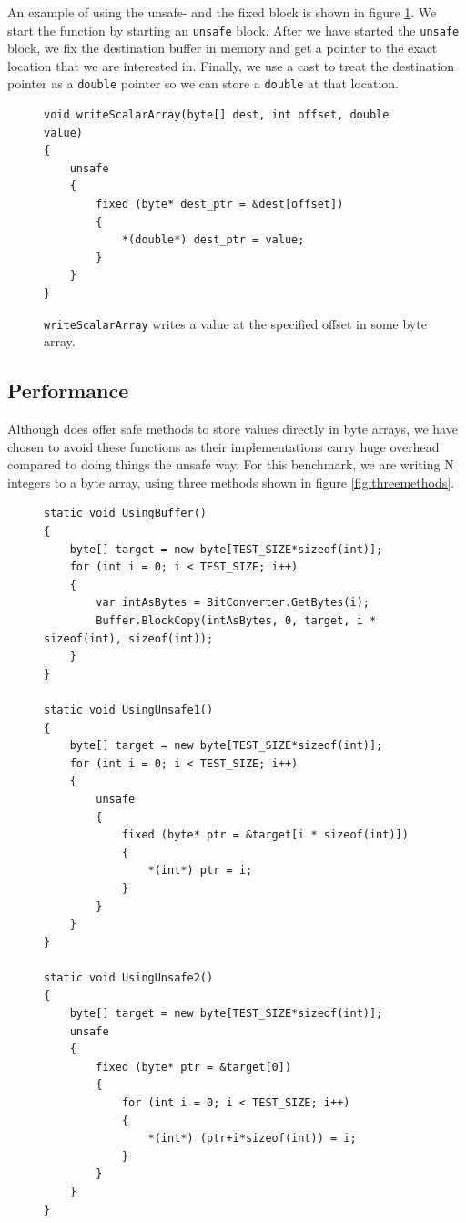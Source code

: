 \begin{description}
An example of using the unsafe- and the fixed block is shown in figure
\ref{fig:writeScalarArray'}. We start the function by starting an
\texttt{unsafe} block. After we have started the \texttt{unsafe} block, we fix
the destination buffer in memory and get a pointer to the exact location that we
are interested in. Finally, we use a cast to treat the destination pointer as a
\texttt{double} pointer so we can store a \texttt{double} at that location.
\begin{figure}[h]
\centering
\begin{verbatim}
void writeScalarArray(byte[] dest, int offset, double value)
{
    unsafe
    {
        fixed (byte* dest_ptr = &dest[offset])
        {
            *(double*) dest_ptr = value;
        }
    }
}
\end{verbatim}
\caption{\texttt{writeScalarArray} writes a value at the specified offset in
some byte array.}
\label{fig:writeScalarArray'}
\end{figure}

\subsection{Performance}
\label{marshalunsafeperformance}
Although \csharp{} does offer safe methods to store values directly in byte
arrays, we have chosen to avoid these functions as their implementations carry
huge overhead compared to doing things the unsafe way.
For this benchmark, we are writing N integers to a byte array, using three
methods shown in figure \ref{fig:threemethods}.
\begin{figure}[H]
  \centering
  \begin{verbatim}
static void UsingBuffer()
{
    byte[] target = new byte[TEST_SIZE*sizeof(int)];
    for (int i = 0; i < TEST_SIZE; i++)
    {
        var intAsBytes = BitConverter.GetBytes(i);
        Buffer.BlockCopy(intAsBytes, 0, target, i * sizeof(int), sizeof(int)); 
    }
}

static void UsingUnsafe1()
{
    byte[] target = new byte[TEST_SIZE*sizeof(int)];
    for (int i = 0; i < TEST_SIZE; i++)
    {
        unsafe
        {
            fixed (byte* ptr = &target[i * sizeof(int)])
            {
                *(int*) ptr = i;
            }
        }
    }
}

static void UsingUnsafe2()
{
    byte[] target = new byte[TEST_SIZE*sizeof(int)];
    unsafe
    {
        fixed (byte* ptr = &target[0])
        {
            for (int i = 0; i < TEST_SIZE; i++)
            {
                *(int*) (ptr+i*sizeof(int)) = i;
            }
        }
    }
}


\end{verbatim}
\end{figure}
\end{description}
